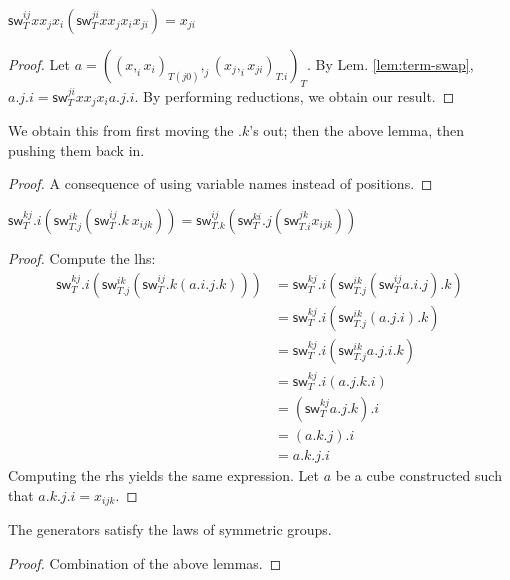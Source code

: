 \documentclass[10pt,a4paper]{article}
\newcommand\CC[4]{(#2,_{#1} #3)_{#4}}
\newcommand\sw[2]{\mathsf{sw}^{#1}_{#2}}
\begin{document}
\begin{lemma}
  $\sw{ij} T x x_j x_i (\sw {ji} T x x_j x_i x_{ji}) = x_{ji}$
\end{lemma}
\begin{proof}
  Let $a = \CC j {\CC i x {x_i} {T(j0)}} {\CC i {x_j} {x_{ji}} {T.i}} T$.
  By Lem. \ref{lem:term-swap}, $a.j.i = \sw {ji} T x x_j x_i
  a.j.i$. By performing reductions, we obtain our result.
\end{proof}
\begin{lemma}[$σ_i^2 = 1$]
  We obtain this from first moving the $.k$'s out; then the above lemma, then pushing them back in.
\end{lemma}
\begin{lemma}[$σ_i ∘ σ_j = σ_j ∘ σ_i$ if $abs(j-i) > 1$]
  
\end{lemma}
\begin{proof}
  A consequence of using variable names instead of positions.
\end{proof}
\begin{lemma}
  [$\sigma_i ∘\sigma_{i+1} ∘\sigma_i = \sigma_{i+1} ∘\sigma_i ∘\sigma_{i+1}$]
  $\sw{kj}T.i (\sw{ik}{T.j} (\sw{ij}{T}.k~ x_{ijk})) = \sw{ij}{T.k} (\sw{ki}T.j  (\sw{jk}{T.i} x_{ijk}))$
\end{lemma}
\begin{proof}
  Compute the lhs:
  \begin{align*}
     \sw{kj}T.i (\sw{ik}{T.j} (\sw{ij}{T}.k (a.i.j.k)) ) 
    &= \sw{kj}T.i (\sw{ik}{T.j} (\sw{ij}{T} a.i.j).k ) \\
    &= \sw{kj}T.i (\sw{ik}{T.j} (a.j.i).k ) \\
    &= \sw{kj}T.i (\sw{ik}{T.j} a.j.i.k ) \\
    &= \sw{kj}T.i  (a.j.k.i) \\
    &= (\sw{kj}T  a.j.k).i \\
    &= (a.k.j).i \\
    &= a.k.j.i 
  \end{align*}
  Computing the rhs yields the same expression.
  Let $a$ be a cube constructed such that $a.k.j.i = x_{ijk}$.
\end{proof}
\begin{theorem}
  The generators satisfy the laws of symmetric groups.
\end{theorem}
\begin{proof}
  Combination of the above lemmas.
\end{proof}
\end{document}
